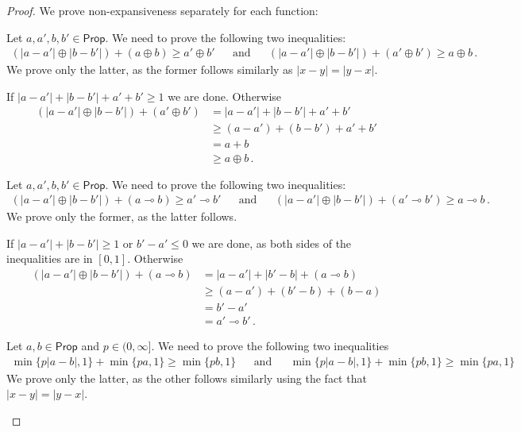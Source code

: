 \documentclass[10pt,a4paper]{amsart}
\newcommand{\Prop}{\mathsf{Prop}}
\newcommand{\lol}{\mathbin{\multimap}}
\begin{document}
\begin{proof}
We prove non-expansiveness separately for each function:
\begin{description}[font=\sc,wide]
    \item[Case $\oplus$:]
    Let $a,a',b,b'\in \Prop$. We need to prove the following two inequalities:
    \begin{align*}
        (|a - a'| \oplus |b-b'|) + (a\oplus b) \geq a' \oplus b'
        &&\text{and}&&
        (|a - a'| \oplus |b-b'|) + (a'\oplus b') \geq a \oplus b \,.
    \end{align*}
    We prove only the latter, as the former follows similarly as $|x - y| = |y - x|$.
    
    If $|a - a'| + |b-b'| + a'+b' \geq 1$ we are done. Otherwise 
    \begin{align*}
        (|a - a'| \oplus |b-b'|) + (a' \oplus b')
        &= |a - a'| + |b-b'| + a'+b' \\
        &\geq (a - a') + (b-b') + a'+b' \\
        &=  a+b \\
        &\geq a \oplus b \,.
    \end{align*}   

    \item[Case $\lol$:]
    Let $a,a',b,b'\in \Prop$. We need to prove the following two inequalities:
    \begin{align*}
        (|a - a'| \oplus |b-b'|) + (a\lol b) \geq a' \lol b'
        &&\text{and}&&
        (|a - a'| \oplus |b-b'|) + (a'\lol b') \geq a \lol b \,.
    \end{align*}
    We prove only the former, as the latter follows.

    If $|a - a'| + |b-b'| \geq 1$ or $b'- a' \leq 0$ we are done, as both sides of the inequalities are in $[0,1]$. Otherwise 
    \begin{align*}
        (|a - a'| \oplus |b-b'|) + (a \lol b)
        &= |a - a'| + |b'-b| + (a \lol b) \\
        &\geq  (a - a') + (b'-b) + (b - a) \\
        &=  b'- a' \\
        &= a' \lol b' \,.
    \end{align*}

    \item[Case $\min\{ p\cdot -, 1\}$:]
    Let $a,b\in \Prop$ and $p \in (0,\infty]$. We need to prove the following two
    inequalities
    \begin{align*}
        \min \{ p|a-b|,1\} + \min\{pa, 1\} \geq \min\{pb, 1\}
        &&\text{and}&&
        \min \{ p|a-b|, 1\} + \min\{pb, 1\} \geq \min\{pa, 1\}
    \end{align*}
    We prove only the latter, as the other follows similarly using the fact
    that $|x-y| = |y-x|$.


\end{description}
\end{proof}
\end{document}
